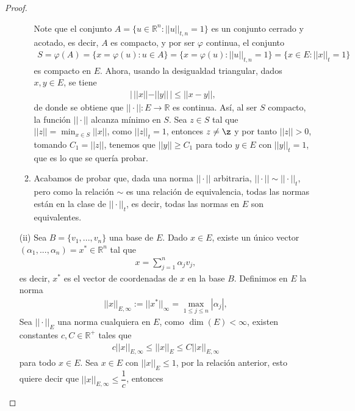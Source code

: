 \begin{proof}
\begin{enumerate}
\begin{enumerate}
                Note que el conjunto $A=\{u \in \mathbb{R}^n:||u||_{t,n}=1\}$ es un conjunto cerrado y acotado, es decir, $A$ es compacto, y por ser $\varphi$ continua, el conjunto 
                \begin{align*}
                    S=\varphi(A)=\{x=\varphi(u):u \in A\}=\{x=\varphi(u):||u||_{t,n}=1\}=\{x \in E:||x||_t=1\}
                \end{align*}
                es compacto en $E$. Ahora, usando la desigualdad triangular, dados $x,y \in E$, se tiene
                \begin{align*}
                    |\,||x||-||y||\,|\leq ||x-y||,
                \end{align*}
                de donde se obtiene que $||\cdot||:E\to \mathbb{R}$ es continua. Así, al ser $S$ compacto, la función $||\cdot||$ alcanza mínimo en $S$. Sea $z \in S$ tal que $||z||=\min_{x\in S}||x||$, como $||z||_t=1$, entonces $z\neq \z$ y por tanto $||z||>0$, tomando $C_1=||z||$, tenemos que $||y||\geq C_1$ para todo $y\in E$ con $||y||_t=1$, que es lo que se quería probar.
                \item Acabamos de probar que, dada una norma $||\cdot||$ arbitraria, $||\cdot||\sim ||\cdot||_t$, pero como la relación $\sim$ es una relación de equivalencia, todas las normas están en la clase de $||\cdot||_t$, es decir, todas las normas en $E$ son equivalentes.
        \end{enumerate}
        \item[(ii)] Sea $B=\{v_1,...,v_n\}$ una base de $E$. Dado $x\in E$, existe un único vector\\
        $(\alpha_1,...,\alpha_n)=x^* \in\mathbb{R}^n$ tal que
   \begin{align*}
       x=\sum_{j=1}^n \alpha_j v_j,
   \end{align*}
   es decir, $x^*$ es el vector de coordenadas de $x$ en la base $B$. Definimos en $E$ la norma
   \begin{align*}
       ||x||_{E,\infty}:=||x^*||_\infty=\max_{1\leq j\leq n}|\alpha_j|,
   \end{align*}
   Sea $||\cdot||_E$ una norma cualquiera en $E$, como $\dim(E)<\infty$, existen constantes $c,C\in \mathbb{R}^+$ tales que
   \begin{align*}
       c||x||_{E,\infty}\leq ||x||_E\leq C||x||_{E,\infty}
   \end{align*}
   para todo $x \in E$. Sea $x \in E$ con $||x||_E\leq 1$, por la relación anterior, esto quiere decir que $||x||_{E,\infty}\leq \dfrac{1}{c}$, entonces

\end{enumerate}
\end{proof}

